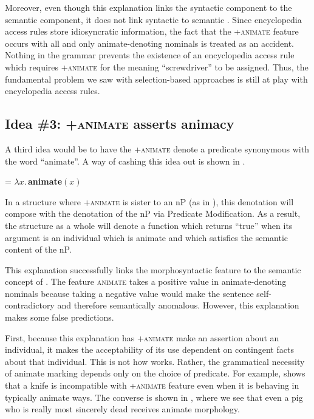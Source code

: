 \documentclass[output=paper,newtxmath,modfonts,nonflat,hidelinks]{langsci/langscibook}
\begin{document}
Moreover, even though this explanation links the syntactic component to the semantic component, it does not link syntactic  to semantic .  Since encyclopedia access rules store idiosyncratic information, the fact that the +\textsc{animate} feature occurs with all and only animate-denoting nominals is treated as an accident. Nothing in the grammar prevents the existence of an encyclopedia access rule which requires +\textsc{animate} for the meaning ``screwdriver'' to be assigned.   Thus, the fundamental problem we saw with selection-based approaches is still at play with encyclopedia access rules. 

\subsection{Idea \#3: +\textsc{animate} asserts animacy} \label{sec:pesetsky:assertanimacy}

A third idea would be to have the +\textsc{animate} denote a predicate synonymous with the word ``animate''.  A way of cashing this idea out is shown in .

\ea\label{ex:pesetsky:lambdabdas}  = $\lambda x . \,$\textbf{animate}$(x)$ \z

In a structure where +\textsc{animate} is sister to an nP (as in ), this denotation will compose with the denotation of the nP via Predicate Modification.  As a result, the structure as a whole will denote a function which returns ``true'' when its argument is an individual which is animate and which satisfies the semantic content of the nP. 

This explanation successfully links the morphosyntactic  feature to the semantic concept of .  The feature \textsc{animate} takes a positive value in animate-denoting nominals because taking a negative value would make the sentence self-contradictory and therefore semantically anomalous.  However, this explanation makes some false predictions.

\largerpage
First, because this explanation has +\textsc{animate} make an assertion about an individual, it makes the acceptability of its use dependent on contingent facts about that individual.  This is not how  works.  Rather, the grammatical necessity of animate marking depends only on the choice of predicate. For example,  shows that a knife is incompatible with +\textsc{animate} feature even when it is behaving in typically animate ways.  The converse is shown in , where we see that even a pig who is really most sincerely dead receives animate morphology.
\end{document}
